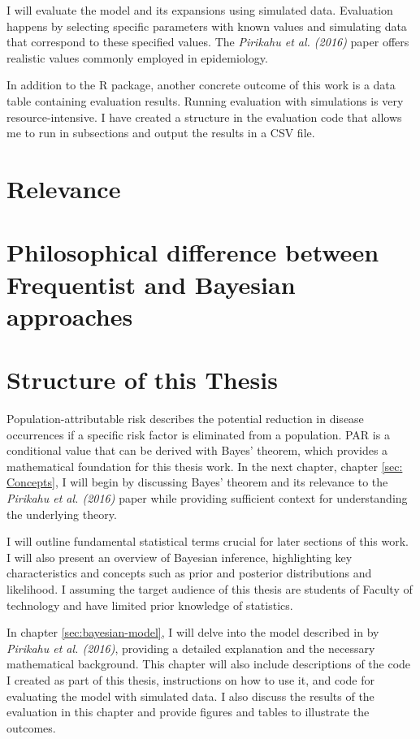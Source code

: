 I will evaluate the model and its expansions using simulated data. Evaluation happens by selecting specific parameters with known values and simulating data that correspond to these specified values. The \textit{Pirikahu et al. (2016)} paper offers realistic values commonly employed in epidemiology. 

In addition to the R package, another concrete outcome of this work is a data table containing evaluation results. Running evaluation with simulations is very resource-intensive. I have created a structure in the evaluation code that allows me to run in subsections and output the results in a CSV file.

\section{Relevance}

\section{Philosophical difference between Frequentist and Bayesian approaches}


\section{Structure of this Thesis} \label{sec:Structure}

Population-attributable risk describes the potential reduction in disease occurrences if a specific risk factor is eliminated from a population. PAR is a conditional value that can be derived with Bayes' theorem, which provides a mathematical foundation for this thesis work. In the next chapter, chapter \ref{sec: Concepts}, I will begin by discussing Bayes' theorem and its relevance to the \textit{Pirikahu et al. (2016)} paper while providing sufficient context for understanding the underlying theory.

I will outline fundamental statistical terms crucial for later sections of this work. I will also present an overview of Bayesian inference, highlighting key characteristics and concepts such as prior and posterior distributions and likelihood. I assuming the target audience of this thesis are students of Faculty of technology and have limited prior knowledge of statistics.

In chapter \ref{sec:bayesian-model}, I will delve into the model described in by \textit{Pirikahu et al. (2016)}, providing a detailed explanation and the necessary mathematical background. This chapter will also include descriptions of the code I created as part of this thesis, instructions on how to use it, and code for evaluating the model with simulated data. I also discuss the results of the evaluation in this chapter and provide figures and tables to illustrate the outcomes.

